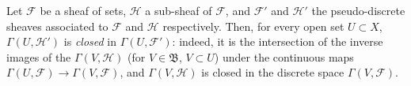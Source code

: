 \begin{env}[3.8.3]
\label{0.3.8.3}
Let $\mathcal{F}$ be a sheaf of sets, $\mathcal{H}$ a sub-sheaf of
$\mathcal{F}$, and $\mathcal{F}'$ and $\mathcal{H}'$ the pseudo-discrete sheaves
associated to $\mathcal{F}$ and $\mathcal{H}$ respectively. Then, for every
open set $U\subset X$, $\Gamma(U,\mathcal{H}')$ is \emph{closed} in
$\Gamma(U,\mathcal{F}')$: indeed, it is the intersection of the inverse
images of the $\Gamma(V,\mathcal{H})$ (for $V\in\mathfrak{B}$,
$V\subset U$) under the continuous maps
$\Gamma(U,\mathcal{F})\to\Gamma(V,\mathcal{F})$, and
$\Gamma(V,\mathcal{H})$ is closed in the discrete space
$\Gamma(V,\mathcal{F})$.
\end{env}

